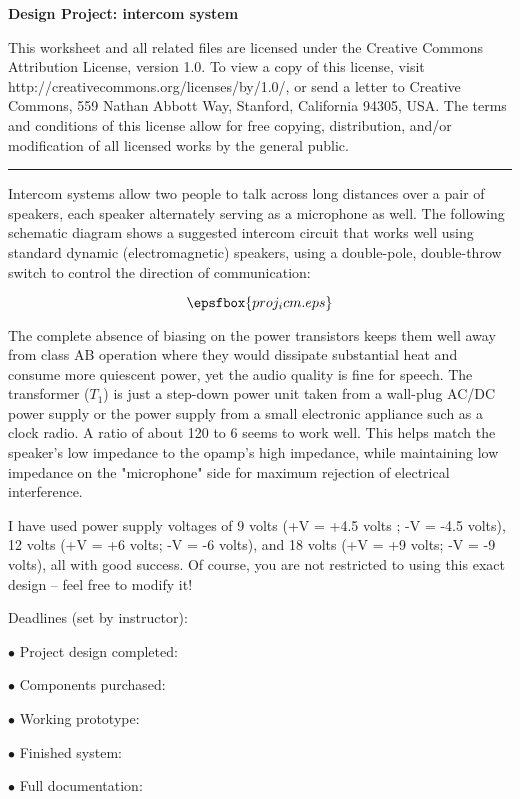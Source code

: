 
\centerline{\bf Design Project: intercom system} \bigskip 
 
This worksheet and all related files are licensed under the Creative Commons Attribution License, version 1.0.  To view a copy of this license, visit http://creativecommons.org/licenses/by/1.0/, or send a letter to Creative Commons, 559 Nathan Abbott Way, Stanford, California 94305, USA.  The terms and conditions of this license allow for free copying, distribution, and/or modification of all licensed works by the general public.

\bigskip 

\hrule

\vskip 10pt

Intercom systems allow two people to talk across long distances over a pair of speakers, each speaker alternately serving as a microphone as well.  The following schematic diagram shows a suggested intercom circuit that works well using standard dynamic (electromagnetic) speakers, using a double-pole, double-throw switch to control the direction of communication:

$$\epsfbox{proj_icm.eps}$$

The complete absence of biasing on the power transistors keeps them well away from class AB operation where they would dissipate substantial heat and consume more quiescent power, yet the audio quality is fine for speech.  The transformer ($T_1$) is just a step-down power unit taken from a wall-plug AC/DC power supply or the power supply from a small electronic appliance such as a clock radio.  A ratio of about 120 to 6 seems to work well.  This helps match the speaker's low impedance to the opamp's high impedance, while maintaining low impedance on the "microphone" side for maximum rejection of electrical interference.

I have used power supply voltages of 9 volts (+V = +4.5 volts ; -V = -4.5 volts), 12 volts (+V = +6 volts; -V = -6 volts), and 18 volts (+V = +9 volts; -V = -9 volts), all with good success.  Of course, you are not restricted to using this exact design -- feel free to modify it!

\vskip 10pt

\noindent
Deadlines (set by instructor):

\medskip
\item{$\bullet$} Project design completed: 
\item{$\bullet$} Components purchased:
\item{$\bullet$} Working prototype:
\item{$\bullet$} Finished system:
\item{$\bullet$} Full documentation:
\medskip





